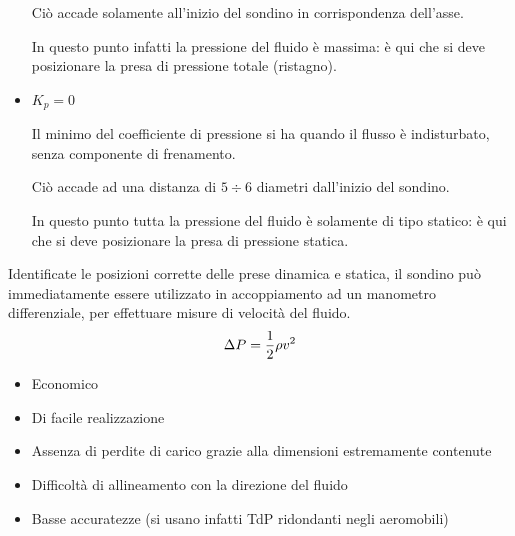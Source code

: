 \documentclass[a4paper, 15pt]{article}
\newcommand{\cmark}{\ding{51}}
\newcommand{\xmark}{\ding{55}}
\begin{document}
\begin{adjustwidth}{2in}{}
\begin{itemize}
		Ciò accade solamente all’inizio
		del sondino in corrispondenza dell’asse. 
		
		In questo punto infatti la pressione del fluido è massima: è qui che si deve posizionare la presa di pressione totale (ristagno).
		
		\item \(K_p = 0\)
		
		Il minimo del coefficiente di pressione si ha quando il flusso è indisturbato, senza componente di frenamento.
		
		Ciò accade ad una distanza di $5\div6$ diametri dall’inizio del sondino.
		
		In questo punto tutta la pressione del fluido è solamente di tipo statico: è qui che si deve posizionare la presa di pressione statica.
	\end{itemize}
	Identificate le posizioni corrette delle prese dinamica e statica, il sondino può immediatamente essere utilizzato in accoppiamento ad
	un manometro differenziale, per effettuare misure di velocità del fluido.
	\[\Delta P = {1\over2}\rho v^2\]
	
	\begin{itemize}[label = \textcolor{green}{\cmark}]
		\item Economico
		\item Di facile realizzazione 
		\item Assenza di perdite di carico grazie alla dimensioni estremamente contenute
	\end{itemize}
	
	\begin{itemize}[label = \textcolor{red}{\xmark}]
	\item Difficoltà di allineamento con la direzione del fluido
	\item Basse accuratezze (si usano infatti TdP ridondanti negli aeromobili)
	\end{itemize}
\end{adjustwidth}
\end{document}
